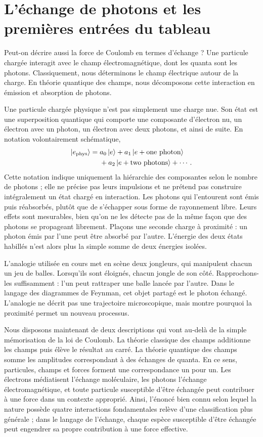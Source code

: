 \section{L’échange de photons et les premières entrées du tableau}

Peut-on décrire aussi la force de Coulomb en termes d’échange ? Une particule chargée interagit avec le champ électromagnétique, dont les quanta sont les photons. Classiquement, nous déterminons le champ électrique autour de la charge. En théorie quantique des champs, nous décomposons cette interaction en émission et absorption de photons.

Une particule chargée physique n’est pas simplement une charge nue. Son état est une superposition quantique qui comporte une composante d’électron nu, un électron avec un photon, un électron avec deux photons, et ainsi de suite. En notation volontairement schématique,
\begin{equation}
\begin{aligned}
\left\lvert e_{\mathrm{phys}}\right\rangle
={}&a_0\left\lvert e\right\rangle
+a_1\left\lvert e+\text{one photon}\right\rangle
\\
&+a_2\left\lvert e+\text{two photons}\right\rangle+\cdots .
\end{aligned}
\end{equation}
Cette notation indique uniquement la hiérarchie des composantes selon le nombre de photons ; elle ne précise pas leurs impulsions et ne prétend pas construire intégralement un état chargé en interaction.
Les photons qui l’entourent sont émis puis réabsorbés, plutôt que de s’échapper sous forme de rayonnement libre. Leurs effets sont mesurables, bien qu’on ne les détecte pas de la même façon que des photons se propageant librement. Plaçons une seconde charge à proximité : un photon émis par l’une peut être absorbé par l’autre. L’énergie des deux états habillés n’est alors plus la simple somme de deux énergies isolées.

L’analogie utilisée en cours met en scène deux jongleurs, qui manipulent chacun un jeu de balles. Lorsqu’ils sont éloignés, chacun jongle de son côté. Rapprochons-les suffisamment : l’un peut rattraper une balle lancée par l’autre. Dans le langage des diagrammes de Feynman, cet objet partagé est le photon échangé. L’analogie ne décrit pas une trajectoire microscopique, mais montre pourquoi la proximité permet un nouveau processus.

Nous disposons maintenant de deux descriptions qui vont au-delà de la simple mémorisation de la loi de Coulomb. La théorie classique des champs additionne les champs puis élève le résultat au carré. La théorie quantique des champs somme les amplitudes correspondant à des échanges de quanta. En ce sens, particules, champs et forces forment une correspondance un pour un. Les électrons médiatisent l’échange moléculaire, les photons l’échange électromagnétique, et toute particule susceptible d’être échangée peut contribuer à une force dans un contexte approprié. Ainsi, l’énoncé bien connu selon lequel la nature possède quatre interactions fondamentales relève d’une classification plus générale ; dans le langage de l’échange, chaque espèce susceptible d’être échangée peut engendrer sa propre contribution à une force effective.

